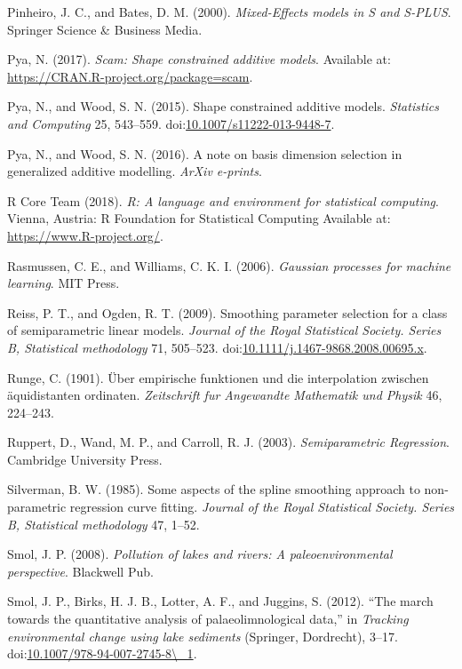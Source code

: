 \documentclass[12pt,]{article}
\begin{document}
\hypertarget{ref-Pinheiro2000-kx}{}
Pinheiro, J. C., and Bates, D. M. (2000). \emph{Mixed-Effects models in
S and S-PLUS}. Springer Science \& Business Media.

\hypertarget{ref-pya-scam-pkg}{}
Pya, N. (2017). \emph{Scam: Shape constrained additive models}.
Available at: \url{https://CRAN.R-project.org/package=scam}.

\hypertarget{ref-Pya2015-wr}{}
Pya, N., and Wood, S. N. (2015). Shape constrained additive models.
\emph{Statistics and Computing} 25, 543--559.
doi:\href{https://doi.org/10.1007/s11222-013-9448-7}{10.1007/s11222-013-9448-7}.

\hypertarget{ref-Pya2016-rk}{}
Pya, N., and Wood, S. N. (2016). A note on basis dimension selection in
generalized additive modelling. \emph{ArXiv e-prints}.

\hypertarget{ref-Rcore}{}
R Core Team (2018). \emph{R: A language and environment for statistical
computing}. Vienna, Austria: R Foundation for Statistical Computing
Available at: \url{https://www.R-project.org/}.

\hypertarget{ref-Rasmussen2006-xk}{}
Rasmussen, C. E., and Williams, C. K. I. (2006). \emph{Gaussian
processes for machine learning}. MIT Press.

\hypertarget{ref-Reiss2009-fk}{}
Reiss, P. T., and Ogden, R. T. (2009). Smoothing parameter selection for
a class of semiparametric linear models. \emph{Journal of the Royal
Statistical Society. Series B, Statistical methodology} 71, 505--523.
doi:\href{https://doi.org/10.1111/j.1467-9868.2008.00695.x}{10.1111/j.1467-9868.2008.00695.x}.

\hypertarget{ref-Runge1901-tc}{}
Runge, C. (1901). Über empirische funktionen und die interpolation
zwischen äquidistanten ordinaten. \emph{Zeitschrift fur Angewandte
Mathematik und Physik} 46, 224--243.

\hypertarget{ref-Ruppert2003-pt}{}
Ruppert, D., Wand, M. P., and Carroll, R. J. (2003).
\emph{Semiparametric Regression}. Cambridge University Press.

\hypertarget{ref-Silverman1985-kw}{}
Silverman, B. W. (1985). Some aspects of the spline smoothing approach
to non-parametric regression curve fitting. \emph{Journal of the Royal
Statistical Society. Series B, Statistical methodology} 47, 1--52.

\hypertarget{ref-Smol2008-ld}{}
Smol, J. P. (2008). \emph{Pollution of lakes and rivers: A
paleoenvironmental perspective}. Blackwell Pub.

\hypertarget{ref-Smol2012-xt}{}
Smol, J. P., Birks, H. J. B., Lotter, A. F., and Juggins, S. (2012).
``The march towards the quantitative analysis of palaeolimnological
data,'' in \emph{Tracking environmental change using lake sediments}
(Springer, Dordrecht), 3--17.
doi:\href{https://doi.org/10.1007/978-94-007-2745-8/_1}{10.1007/978-94-007-2745-8\textbackslash{}\_1}.
\end{document}
